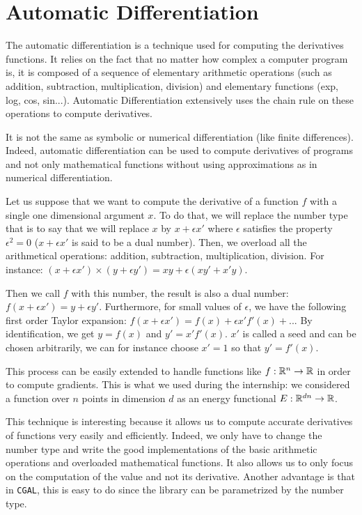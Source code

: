 \chapter{Automatic Differentiation}
\label{appendix:ad}

The automatic differentiation is a technique used for computing the derivatives
functions. It relies on the fact that no matter how complex a computer program
is, it is composed of a sequence of elementary arithmetic operations (such as
addition, subtraction, multiplication, division) and elementary functions (exp,
log, cos, sin...). Automatic Differentiation extensively uses the chain rule on
these operations to compute derivatives.

It is not the same as symbolic or numerical differentiation (like finite
differences). Indeed, automatic differentiation can be used to compute
derivatives of programs and not only mathematical functions without using
approximations as in numerical differentiation.

Let us suppose that we want to compute the derivative of a function $ f $ with a
single one dimensional argument $ x $. To do that, we will replace the number
type that is to say that we will replace $ x $ by $ x + \epsilon x' $ where $
\epsilon $ satisfies the property $ \epsilon^2 = 0 $ ($ x + \epsilon x' $ is
said to be a dual number). Then, we overload all the arithmetical operations:
addition, subtraction, multiplication, division. For instance: $ (x + \epsilon
x') \times (y + \epsilon y') = x y + \epsilon (x y' + x' y) $.

Then we call $ f $ with this number, the result is also a dual number: $ f(x +
\epsilon x') = y + \epsilon y' $.  Furthermore, for small values of $ \epsilon
$, we have the following first order Taylor expansion: $ f(x + \epsilon x') =
f(x) + \epsilon x' f'(x) + ... $ By identification, we get $ y = f(x) $ and $
y' = x' f'(x) $. $ x' $ is called a seed and can be chosen arbitrarily, we can
for instance choose $ x ' = 1 $ so that $ y' = f'(x) $.

This process can be easily extended to handle functions like $ f : \mathbb{R}^n
\rightarrow \mathbb{R} $ in order to compute gradients. This is what we used during the
internship: we considered a function over $ n $ points in dimension $ d $ as an
energy functional $ E : \mathbb{R}^{dn} \rightarrow \mathbb{R} $.

This technique is interesting because it allows us to compute accurate
derivatives of functions very easily and efficiently. Indeed, we only have to
change the number type and write the good implementations of the basic
arithmetic operations and overloaded mathematical functions. It also allows us
to only focus on the computation of the value and not its derivative. Another
advantage is that in \texttt{CGAL}, this is easy to do since the library can be
parametrized by the number type.

